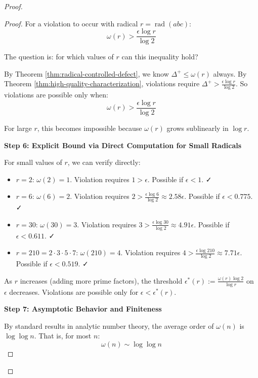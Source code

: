 \begin{proof}
\begin{proof}
For a violation to occur with radical $r = \operatorname{rad}(abc)$:
\begin{equation}
\omega(r) > \frac{\epsilon \log r}{\log 2}
\end{equation}

The question is: for which values of $r$ can this inequality hold?

By Theorem \ref{thm:radical-controlled-defect}, we know $\Delta^+ \leq \omega(r)$ always. By Theorem \ref{thm:high-quality-characterization}, violations require $\Delta^+ > \frac{\epsilon \log r}{\log 2}$. So violations are possible only when:
\begin{equation}
\omega(r) > \frac{\epsilon \log r}{\log 2}
\end{equation}

For large $r$, this becomes impossible because $\omega(r)$ grows sublinearly in $\log r$.

\noindent \textbf{Step 6: Explicit Bound via Direct Computation for Small Radicals}

For small values of $r$, we can verify directly:

\begin{itemize}
\item $r = 2$: $\omega(2) = 1$. Violation requires $1 > \epsilon$. Possible if $\epsilon < 1$. ✓
\item $r = 6$: $\omega(6) = 2$. Violation requires $2 > \frac{\epsilon \log 6}{\log 2} \approx 2.58\epsilon$. Possible if $\epsilon < 0.775$. ✓
\item $r = 30$: $\omega(30) = 3$. Violation requires $3 > \frac{\epsilon \log 30}{\log 2} \approx 4.91\epsilon$. Possible if $\epsilon < 0.611$. ✓
\item $r = 210 = 2 \cdot 3 \cdot 5 \cdot 7$: $\omega(210) = 4$. Violation requires $4 > \frac{\epsilon \log 210}{\log 2} \approx 7.71\epsilon$. Possible if $\epsilon < 0.519$. ✓
\end{itemize}

As $r$ increases (adding more prime factors), the threshold $\epsilon^*(r) := \frac{\omega(r) \log 2}{\log r}$ on $\epsilon$ decreases. Violations are possible only for $\epsilon < \epsilon^*(r)$.

\noindent \textbf{Step 7: Asymptotic Behavior and Finiteness}

By standard results in analytic number theory, the average order of $\omega(n)$ is $\log \log n$. That is, for most $n$:
\begin{equation}
\omega(n) \sim \log \log n
\end{equation}


\end{proof}
\end{proof}
